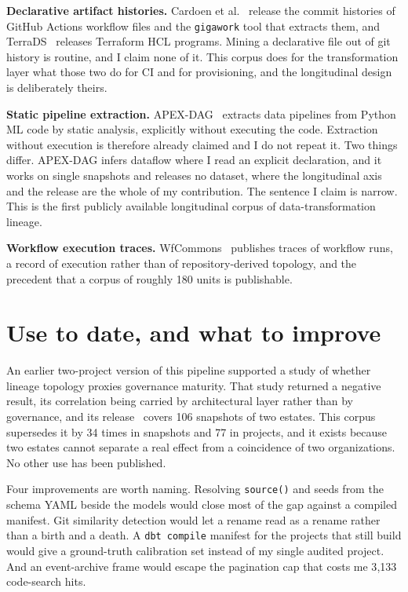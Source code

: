 \documentclass[10pt,conference]{IEEEtran}
\begin{document}
\textbf{Declarative artifact histories.} Cardoen et al.~\cite{cardoen2024}
release the commit histories of GitHub Actions workflow files and the
\texttt{gigawork} tool that extracts them, and TerraDS~\cite{terrads2025}
releases Terraform HCL programs. Mining a declarative file out of git history is
routine, and I claim none of it. This corpus does for the transformation layer
what those two do for CI and for provisioning, and the longitudinal design is
deliberately theirs.

\textbf{Static pipeline extraction.} APEX-DAG~\cite{eggers2025} extracts data
pipelines from Python ML code by static analysis, explicitly without executing
the code. Extraction without execution is therefore already claimed and I do not
repeat it. Two things differ. APEX-DAG infers dataflow where I read an explicit
declaration, and it works on single snapshots and releases no dataset, where the
longitudinal axis and the release are the whole of my contribution. The sentence
I claim is narrow. This is the first publicly available longitudinal corpus of
data-transformation lineage.

\textbf{Workflow execution traces.} WfCommons~\cite{coleman2022} publishes
traces of workflow runs, a record of execution rather than of repository-derived
topology, and the precedent that a corpus of roughly 180 units is publishable.

\section{Use to date, and what to improve}

An earlier two-project version of this pipeline supported a study of whether
lineage topology proxies governance maturity. That study returned a negative
result, its correlation being carried by architectural layer rather than by
governance, and its release~\cite{hari2026} covers 106 snapshots of two estates. This corpus
supersedes it by 34 times in snapshots and 77 in projects, and it exists because
two estates cannot separate a real effect from a coincidence of two
organizations. No other use has been published.

Four improvements are worth naming. Resolving \texttt{source()} and seeds from
the schema YAML beside the models would close most of the gap against a compiled
manifest. Git similarity detection would let a rename read as a rename rather
than a birth and a death. A \texttt{dbt compile} manifest for the projects that
still build would give a ground-truth calibration set instead of my single
audited project. And an event-archive frame would escape the pagination cap that
costs me 3{,}133 code-search hits.
\end{document}
